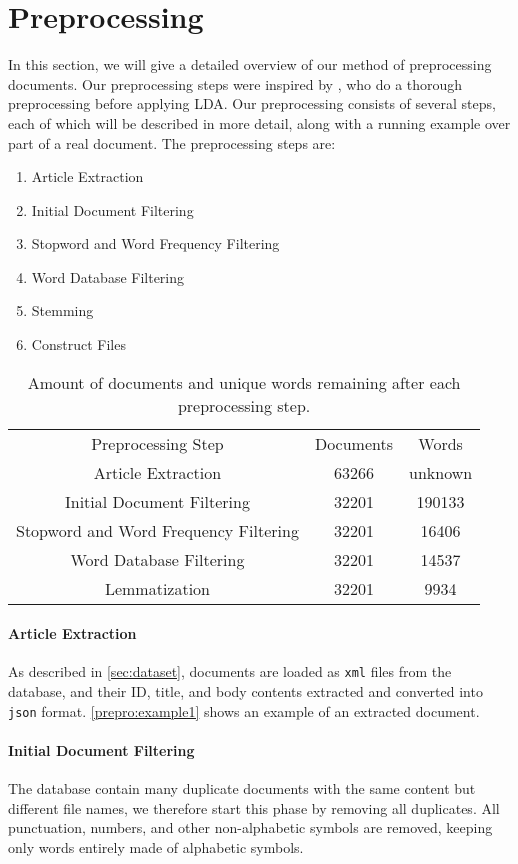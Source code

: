 \section{Preprocessing}\label{sec:prepro}

In this section, we will give a detailed overview of our method of preprocessing documents.
Our preprocessing steps were inspired by \cite{quanti}, who do a thorough preprocessing before applying LDA. 
Our preprocessing consists of several steps, each of which will be described in more detail, along with a running example over part of a real document.
The preprocessing steps are:
\begin{enumerate}[label=\alph*]
	\item Article Extraction
	\item Initial Document Filtering
	\item Stopword and Word Frequency Filtering
	\item Word Database Filtering
	\item Stemming
	\item Construct Files
\end{enumerate}

\begin{table}
	\begin{tabular}{c|c|c}
		Preprocessing Step & Documents & Words\\
		Article Extraction & 63266 & unknown \\ 
		Initial Document Filtering & 32201 & 190133 \\ 
		Stopword and Word Frequency Filtering & 32201 & 16406 \\
		Word Database Filtering & 32201 & 14537 \\
		Lemmatization & 32201 & 9934\\
	\end{tabular}
	\label{tab:prepro_doc_word}
	\caption{Amount of documents and unique words remaining after each preprocessing step.}
\end{table}

\paragraph{Article Extraction}
As described in \autoref{sec:dataset}, documents are loaded as \texttt{xml} files from the database, and their ID, title, and body contents extracted and converted into \texttt{json} format.
\autoref{prepro:example1} shows an example of an extracted document.

\paragraph{Initial Document Filtering}
The database contain many duplicate documents with the same content but different file names, we therefore start this phase by removing all duplicates.
All punctuation, numbers, and other non-alphabetic symbols are removed, keeping only words entirely made of alphabetic symbols.

